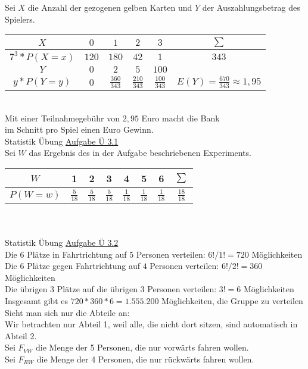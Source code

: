 \documentclass[a4paper, 12pt]{article} %
\newcommand{\aufgabe}[1]{{\huge Statistik Übung \underline{Aufgabe #1}}\\[3.5ex]  }
\begin{document}
Sei $X$ die Anzahl der gezogenen gelben Karten und $Y$ der Auszahlungsbetrag des Spielers. \\
\begin{tabular}{|c||c|c|c|c||c|}
\hline 
$X$	&		$0$	&	$1$	&	$2$	&	$3$	& 	$\sum$	\\ \hline
\hline
$7^3 * P(X=x)$ &	$120$	&	$180$	&	$42$	&	$1$	&	$343$	\\ \hline
$Y$	 &		$0$	&	$2$	&	$5$	&	$100$	&		\\ \hline
$y * P(Y=y)$ &	$0$	&	$\frac{360}{343}$ & $\frac{210}{343}$ & $\frac{100}{343}$	& 	$E(Y) = \frac{670}{343} \approx 1,95$ \\ \hline
\end{tabular}\\[1ex]
Mit einer Teilnahmegebühr von {\boldmath$2,95 $ Euro} macht die Bank \\im Schnitt pro Spiel einen Euro Gewinn. \\
\newpage
\aufgabe{Ü 3.1}
Sei $W$ das Ergebnis des in der Aufgabe beschriebenen Experiments. \\
\begin{tabular}{| c || c | c | c | c | c | c || c | }
\hline
$W$ 	& 	1 	& 	2 	& 	3 	& 	4 	& 	5 	& 	6 	& $\sum$ \\ \hline
$P(W=w)$ &	$\frac{5}{18}$ &	$\frac{5}{18}$ &	$\frac{5}{18}$ &	$\frac{1}{18}$ &	$\frac{1}{18}$ &	$\frac{1}{18}$ &	$\frac{18}{18}$  \\ \hline
\end{tabular} \\[2cm]
\- \dotfill
\\[4ex]
\aufgabe{Ü 3.2}
Die $6$ Plätze in Fahrtrichtung auf $5$ Personen verteilen: $6! / 1! = 720$ Möglichkeiten \\
Die $6$ Plätze gegen Fahrtrichtung auf $4$ Personen verteilen: $6! / 2! = 360$ Möglichkeiten \\
Die übrigen $3$ Plätze auf die übrigen $3$ Personen verteilen: $3! = 6$ Möglichkeiten \\
Insgesamt gibt es $720 * 360 * 6 = 1.555.200$ Möglichkeiten, die Gruppe zu verteilen \\
\bigskip
Sieht man sich nur die Abteile an: \\
Wir betrachten nur Abteil 1, weil alle, die nicht dort sitzen, sind automatisch in Abteil 2. \\
Sei $F_{VW}$ die Menge der 5 Personen, die nur vorwärts fahren wollen. \\
Sei $F_{RW}$ die Menge der 4 Personen, die nur rückwärts fahren wollen. \\
\end{document}
